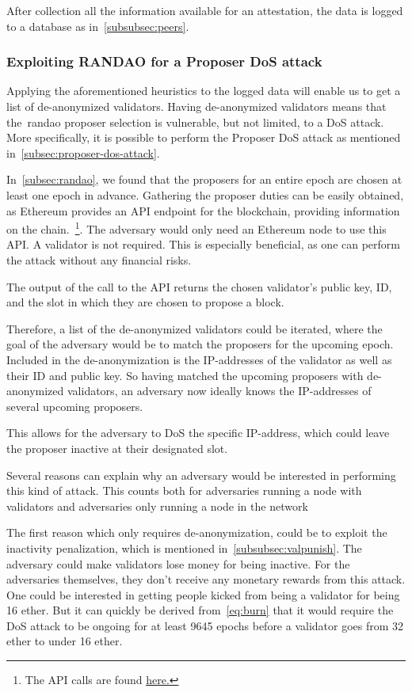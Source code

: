 After collection all the information available for an attestation,
the data is logged to a database as in~\autoref{subsubsec:peers}.

\subsubsection{Exploiting RANDAO for a Proposer DoS attack}
Applying the aforementioned heuristics to the logged data will enable us to get a list of de-anonymized validators.
Having de-anonymized validators means that the~\gls{randao} proposer selection is vulnerable, but not limited, to a DoS attack.
More specifically, it is possible to perform the Proposer DoS attack as mentioned in~\autoref{subsec:proposer-dos-attack}.

In~\autoref{subsec:randao}, we found that the proposers for an entire epoch are chosen at least one epoch in advance.
Gathering the proposer duties can be easily obtained, as Ethereum provides an API endpoint for the blockchain, providing information on the chain.~\footnote{The API calls are found \href{https://ethereum.github.io/beacon-APIs/\#/Validator/getProposerDuties}{here.}}.
The adversary would only need an Ethereum node to use this API.
A validator is not required.
This is especially beneficial, as one can perform the attack without any financial risks.

The output of the call to the API returns the chosen validator's public key, ID, and the slot in which they are chosen to propose a block.

Therefore, a list of the de-anonymized validators could be iterated, where the goal of the adversary would be to match the proposers for the upcoming epoch.
Included in the de-anonymization is the IP-addresses of the validator as well as their ID and public key.
So having matched the upcoming proposers with de-anonymized validators, an adversary now ideally knows the IP-addresses of several upcoming proposers.

This allows for the adversary to DoS the specific IP-address, which could leave the proposer inactive at their designated slot.


Several reasons can explain why an adversary would be interested in performing this kind of attack.
This counts both for adversaries running a node with validators and adversaries only running a node in the network


The first reason which only requires de-anonymization, could be to exploit the inactivity penalization, which is mentioned in~\autoref{subsubsec:valpunish}.
The adversary could make validators lose money for being inactive.
For the adversaries themselves, they don't receive any monetary rewards from this attack. 
One could be interested in getting people kicked from being a validator for being 16 ether.
But it can quickly be derived from~\autoref{eq:burn} that it would require the DoS attack to be ongoing for at least 9645 epochs before a validator goes from 32 ether to under 16 ether.


